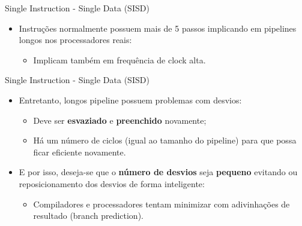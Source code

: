 \begin{frame}{Single Instruction - Single Data (SISD)}
    \begin{itemize}
		\item Instruções normalmente possuem mais de 5 passos implicando em pipelines longos nos processadores reais:
		\begin{itemize}
			\item Implicam também em frequência de clock alta.
		\end{itemize}

	\end{itemize}

\end{frame}


\begin{frame}{Single Instruction - Single Data (SISD)}
    \begin{itemize}
		\item Entretanto, longos pipeline possuem problemas com desvios:
		\begin{itemize}
			\item Deve ser \textbf{esvaziado} e \textbf{preenchido} novamente;
			\item Há um número de ciclos (igual ao tamanho do pipeline) para que possa ficar eficiente novamente.
		\end{itemize}

		\item E por isso, deseja-se que o \textbf{número de desvios} seja \textbf{pequeno} evitando ou reposicionamento dos desvios de forma inteligente:
		\begin{itemize}
		    \item Compiladores e processadores tentam minimizar com adivinhações de resultado (branch prediction).
		\end{itemize}

	\end{itemize}

\end{frame}


